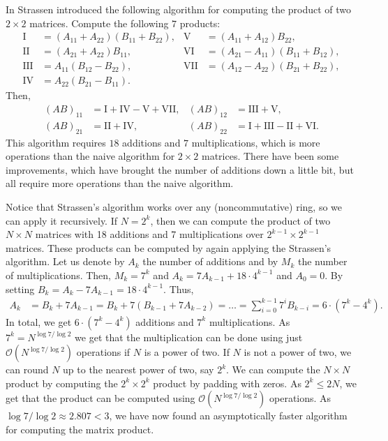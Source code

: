 \documentclass{article}
\theoremstyle{plain}
\theoremstyle{definition}
\theoremstyle{remark}
\begin{document}
In \cite{strassen1969gaussian} Strassen introduced the following algorithm for computing the product of two $2 \times 2$ matrices. Compute the following $7$ products:
\begin{align*}
    \mathrm{I} &= (A_{11} + A_{22})(B_{11} + B_{22}), & \mathrm{V} &= (A_{11} + A_{12})B_{22}, \\
    \mathrm{II} &= (A_{21} + A_{22})B_{11}, & \mathrm{VI} &= (A_{21} - A_{11})(B_{11} + B_{12}), \\
    \mathrm{III} &= A_{11}(B_{12}-B_{22}), & \mathrm{VII} &= (A_{12}- A_{22})(B_{21} + B_{22}), \\
    \mathrm{IV} &= A_{22}(B_{21}-B_{11}).
\end{align*}
Then,
\begin{align*}
    (AB)_{11} &= \mathrm{I} + \mathrm{IV} - \mathrm{V} + \mathrm{VII}, & (AB)_{12} &= \mathrm{III} + \mathrm{V}, \\
    (AB)_{21} &= \mathrm{II} + \mathrm{IV}, & (AB)_{22} &= \mathrm{I} + \mathrm{III} - \mathrm{II} + \mathrm{VI}.
\end{align*}
This algorithm requires $18$ additions and $7$ multiplications, which is more operations than the naive algorithm for $2 \times 2$ matrices. There have been some improvements, which have brought the number of additions down a little bit, but all require more operations than the naive algorithm.

Notice that Strassen's algorithm works over any (noncommutative) ring, so we can apply it recursively. If $N = 2^k$, then we can compute the product of two $N \times N$ matrices with 18 additions and 7 multiplications over $2^{k-1} \times 2^{k-1}$ matrices. These products can be computed by again applying the Strassen's algorithm. Let us denote by $A_k$ the number of additions and by $M_k$ the number of multiplications. Then, $M_k = 7^k$ and $A_k = 7A_{k-1} + 18\cdot 4^{k-1}$ and $A_0 = 0$. By setting $B_k = A_k - 7A_{k-1} = 18\cdot 4^{k-1}$. Thus,
\begin{align*}
    A_k &= B_k + 7A_{k-1} = B_k + 7(B_{k-1} + 7A_{k-2}) = \dots = \sum_{i=0}^{k-1} 7^i B_{k-i} = 6 \cdot (7^k - 4^k).
\end{align*}
In total, we get $6 \cdot (7^k - 4^k)$ additions and $7^k$ multiplications. As $7^k = N^{\log 7 / \log 2}$ we get that the multiplication can be done using just $\mathcal{O}(N^{\log 7 / \log 2})$ operations if $N$ is a power of two. If $N$ is not a power of two, we can round $N$ up to the nearest power of two, say $2^k$. We can compute the $N \times N$ product by computing the $2^k \times 2^k$ product by padding with zeros. As $2^k \leq 2N$, we get that the product can be computed using $\mathcal{O}(N^{\log 7 / \log 2})$ operations. As $\log 7 / \log 2 \approx 2.807 < 3$, we have now found an asymptotically faster algorithm for computing the matrix product.
\end{document}
